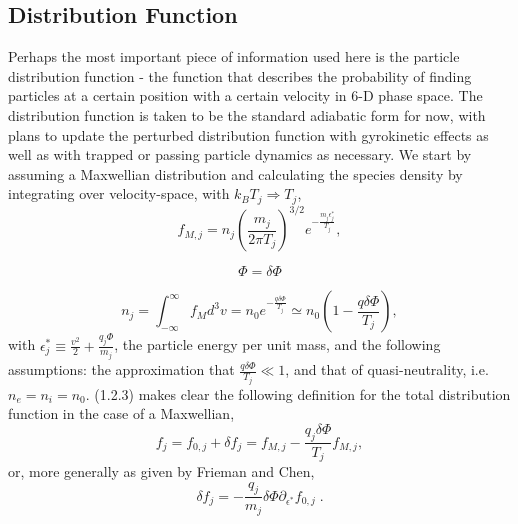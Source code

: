 \documentclass[12pt]{article}
\numberwithin{equation}{subsection}
\begin{document}
\subsection{Distribution Function}
   \quad Perhaps the most important piece of information used here is the particle distribution function - the function that describes the
probability of finding particles at a certain position with a certain velocity in 6-D phase space. The distribution function is taken to be
the standard adiabatic form for now, with plans to update the perturbed distribution function with gyrokinetic effects as well as with trapped
or passing particle dynamics as necessary. We start by assuming a Maxwellian distribution and calculating the species density by integrating over
velocity-space, with $k_B T_j \Rightarrow T_j$,
   \begin{equation}
      f_{M,j} = n_j\left(\frac{m_j}{2\pi T_j}\right)^{3/2}e^{-\frac{m_j \epsilon^*_j}{T_j}},
   \end{equation}
   
   \begin{equation}
      \Phi = \delta\Phi
   \end{equation}
   
   \begin{equation}
      n_j = \int_{-\infty}^{\infty}f_M d^{3}v = n_0e^{-\frac{q\delta\Phi}{T_j}} \simeq n_0(1-\frac{q\delta\Phi}{T_j}),
   \end{equation}
with $\epsilon^*_j \equiv \frac{v^2}{2} + \frac{q_j\Phi}{m_j}$, the particle energy per unit mass, and the following assumptions:
the approximation that $\frac{q\delta\Phi}{T_j} \ll 1$, and that of quasi-neutrality, i.e. $n_e = n_i = n_0$. (1.2.3) makes
clear the following definition for the total distribution function in the case of a Maxwellian,
   \begin{equation}
      f_j = f_{0,j} + \delta f_j = f_{M,j} - \frac{q_j\delta\Phi}{T_j}f_{M,j},
   \end{equation}
or, more generally as given by Frieman and Chen\cite{FriemanChen},
   \begin{equation}
      \delta f_j = -\frac{q_j}{m_j}\delta\Phi\partial_{\epsilon^*}f_{0,j}\;.
   \end{equation}
\end{document}
